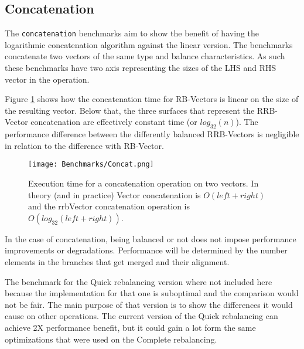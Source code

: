 \FloatBarrier

\subsection{Concatenation}
The \texttt{concatenation} benchmarks aim to show the benefit of having the logarithmic concatenation algorithm against the linear version. The benchmarks concatenate two vectors of the same type and balance characteristics. As such these benchmarks have two axis representing the sizes of the LHS and RHS vector in the operation.



Figure \ref{ConcatBenchmarks} shows how the concatenation time for RB-Vectors is linear on the size of the resulting vector. Below that, the three surfaces that represent the RRB-Vector concatenation are effectively constant time (or $log_{32}(n)$). The performance difference between the differently balanced RRB-Vectors is negligible in relation to the difference with RB-Vector. 

\begin{figure}[h!]
  \centering
  \texttt{[image: Benchmarks/Concat.png]}
  \caption{Execution time for a concatenation operation on two vectors. In theory (and in practice) Vector concatenation is $O(left + right)$ and the rrbVector concatenation operation is $O(log_{32}(left + right))$.}
   \label{ConcatBenchmarks}
\end{figure}

In the case of concatenation, being balanced or not does not impose performance improvements or degradations. Performance will be determined by the number elements in the branches that get merged and their alignment.

The benchmark for the Quick rebalancing version where not included here because the implementation for that one is suboptimal and the comparison would not be fair. The main purpose of that version is to show the differences it would cause on other operations. The current version of the Quick rebalancing can achieve 2X performance benefit, but it could gain a lot form the same optimizations that were used on the Complete rebalancing.

\FloatBarrier

